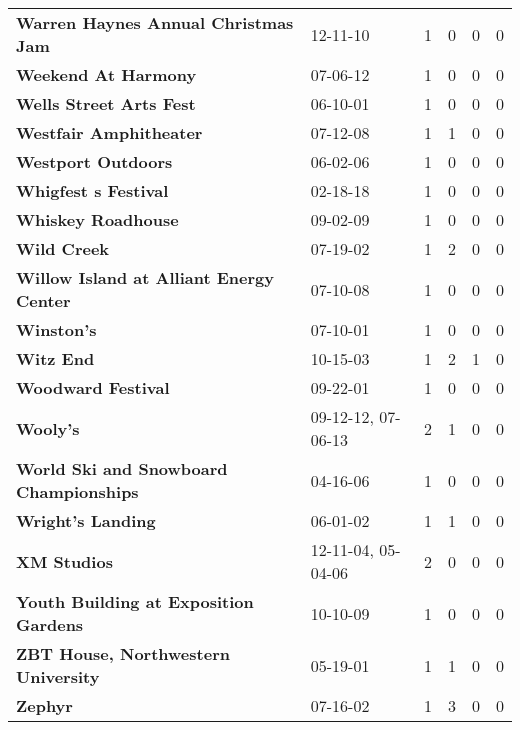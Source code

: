 \begin{supertabular}{p{0.4\textwidth}p{0.3\textwidth}p{0.05\textwidth}p{0.05\textwidth}p{0.05\textwidth}p{0.05\textwidth}}
                          \textbf{Warren Haynes Annual Christmas Jam} &            12-11-10 &  1 &  0 &  0 &  0 \\
                                          \textbf{Weekend At Harmony} &            07-06-12 &  1 &  0 &  0 &  0 \\
                                      \textbf{Wells Street Arts Fest} &            06-10-01 &  1 &  0 &  0 &  0 \\
                                       \textbf{Westfair Amphitheater} &            07-12-08 &  1 &  1 &  0 &  0 \\
                                           \textbf{Westport Outdoors} &            06-02-06 &  1 &  0 &  0 &  0 \\
                                         \textbf{Whigfest s Festival} &            02-18-18 &  1 &  0 &  0 &  0 \\
                                           \textbf{Whiskey Roadhouse} &            09-02-09 &  1 &  0 &  0 &  0 \\
                                                  \textbf{Wild Creek} &            07-19-02 &  1 &  2 &  0 &  0 \\
                      \textbf{Willow Island at Alliant Energy Center} &            07-10-08 &  1 &  0 &  0 &  0 \\
                                                   \textbf{Winston's} &            07-10-01 &  1 &  0 &  0 &  0 \\
                                                    \textbf{Witz End} &            10-15-03 &  1 &  2 &  1 &  0 \\
                                           \textbf{Woodward Festival} &            09-22-01 &  1 &  0 &  0 &  0 \\
                                                     \textbf{Wooly's} &  09-12-12, 07-06-13 &  2 &  1 &  0 &  0 \\
                       \textbf{World Ski and Snowboard Championships} &            04-16-06 &  1 &  0 &  0 &  0 \\
                                            \textbf{Wright's Landing} &            06-01-02 &  1 &  1 &  0 &  0 \\
                                                  \textbf{XM Studios} &  12-11-04, 05-04-06 &  2 &  0 &  0 &  0 \\
                        \textbf{Youth Building at Exposition Gardens} &            10-10-09 &  1 &  0 &  0 &  0 \\
                          \textbf{ZBT House, Northwestern University} &            05-19-01 &  1 &  1 &  0 &  0 \\
                                                      \textbf{Zephyr} &            07-16-02 &  1 &  3 &  0 &  0 \\
\end{supertabular}
